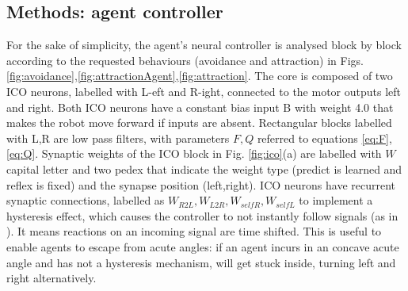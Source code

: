 \subsection{Methods: agent controller}
For the sake of simplicity, the agent's neural controller is analysed block
by block according to the requested behaviours (avoidance and attraction)
in Figs. \ref{fig:avoidance},\ref{fig:attractionAgent},\ref{fig:attraction}.
The core is composed of two ICO neurons, labelled with L-eft and R-ight,
connected to the motor outputs left and right. Both ICO neurons have a
constant bias input B with weight 4.0 that makes the robot move forward
if inputs are absent. Rectangular blocks labelled with L,R are low pass
filters, with parameters $F,Q$ referred to equations \ref{eq:F},\ref{eq:Q}.
Synaptic weights of the ICO block in Fig. \ref{fig:ico}(a) are labelled with
$W$ capital letter and two pedex that indicate the weight type
(predict is learned and reflex is fixed) and the synapse position (left,right).
ICO neurons have recurrent synaptic connections, labelled as
$W_{R2L},W_{L2R},W_{selfR},W_{selfL}$ to implement a hysteresis effect,
which causes the controller to not instantly follow signals (as in \citealt{Hulse2004,Paseman2002}).
It means reactions on an incoming signal are time shifted. This is useful to enable agents to escape from acute angles: if
an agent incurs in an concave acute angle and has not a hysteresis mechanism,
will get stuck inside, turning left and right alternatively.

